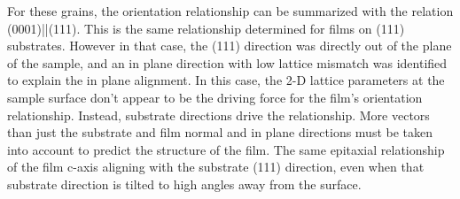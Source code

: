 For these grains, the orientation relationship can be summarized with the relation
(0001)||(111).  This is the same relationship determined for films on
(111) substrates. However in that case, the (111) direction was directly out of
the plane of the sample, and an in plane direction with low lattice mismatch was
identified to explain the in plane alignment. In this case, the 2-D lattice parameters at
the sample surface don't appear to be the driving force for the film's orientation
relationship. Instead, substrate directions drive the relationship. More vectors than just
the substrate and film normal and in plane directions must be taken into account to
predict the structure of the film. The same epitaxial relationship of the film c-axis
aligning with the substrate (111) direction, even when that substrate direction is tilted
to high angles away from the surface.

